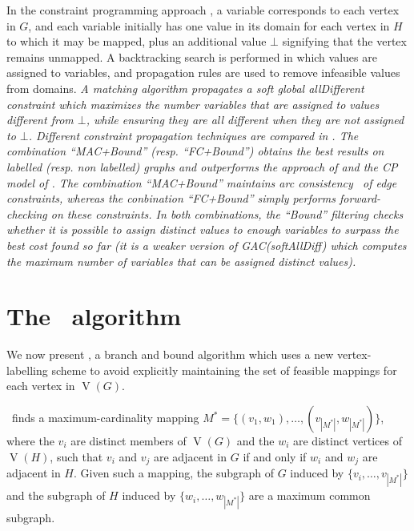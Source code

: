 \documentclass[letterpaper]{article}
\newcommand{\McSplit}{\textproc{McSplit}}
\DeclareMathOperator{\V}{V}
\begin{document}
In the constraint programming approach  \cite{DBLP:conf/cp/NdiayeS11}, a variable corresponds to
each vertex in $G$, and each variable initially has one value in its domain for
each vertex in $H$ to which it may be mapped, plus an additional value $\bot$
signifying that the vertex remains unmapped. A backtracking search is performed
in which values are assigned to variables, and propagation rules are used to
remove infeasible values from domains.
\textit{A matching algorithm propagates
a soft global allDifferent constraint which maximizes the number variables that are assigned to values different from $\bot$, while ensuring they are all different when they are not assigned to $\bot$.
Different constraint propagation techniques are compared in \cite{DBLP:conf/cp/NdiayeS11}. The combination ``MAC+Bound'' (resp. ``FC+Bound'') obtains the best results on labelled (resp. non labelled) graphs and outperforms the approach of \cite{McGreg82} and the CP model of \cite{DBLP:conf/mco/VismaraV08}. The combination ``MAC+Bound'' maintains arc consistency~\cite{sabi94} of edge constraints, whereas the conbination ``FC+Bound'' simply performs forward-checking on these constraints. In both combinations, the ``Bound'' filtering checks whether it is possible to assign distinct values to enough variables to surpass the best cost found so far (it is a weaker version of GAC(\emph{softAllDiff}) \cite{peti01} which computes the maximum number of variables that can be assigned distinct values).}

\section{The \McSplit\ algorithm}

We now present \McSplit, a branch and bound algorithm 
which uses a new vertex-labelling scheme to avoid explicitly maintaining the
set of feasible mappings for each vertex in $\V(G)$. 

\McSplit\ finds a maximum-cardinality mapping $M^* = \{(v_1, w_1), \dots,
(v_{|M^*|}, w_{|M^*|})\}$, where the $v_i$ are distinct members of $\V(G)$ and the
$w_i$ are distinct vertices of $\V(H)$, such that $v_i$ and $v_j$ are adjacent
in $G$ if and only if $w_i$ and $w_j$ are adjacent in $H$. 
Given such a mapping, the subgraph of $G$ induced by $\{v_i, \dots, v_{|M^*|}\}$
and the subgraph of $H$ induced by $\{w_i, \dots, w_{|M^*|}\}$ are a maximum
common subgraph.
\end{document}
